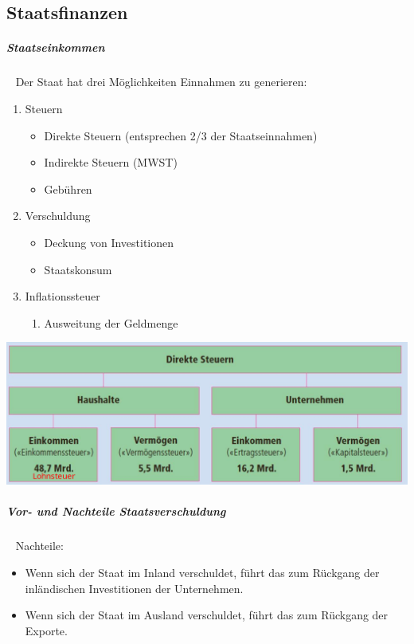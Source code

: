 \documentclass[11pt,twoside,landscape]{article}
\begin{document}
\begin{multicols}{3}
\section{Staatsfinanzen}
\label{sec:orgd2ae535}
\subparagraph{Staatseinkommen} \
\label{sec:org0307bdc}
Der Staat hat drei Möglichkeiten Einnahmen zu generieren:
\begin{enumerate}
\item Steuern
\begin{itemize}
\item Direkte Steuern (entsprechen 2/3 der Staatseinnahmen)
\item Indirekte Steuern (MWST)
\item Gebühren
\end{itemize}
\item Verschuldung
\begin{itemize}
\item Deckung von Investitionen
\item Staatskonsum
\end{itemize}
\item Inflationssteuer
\begin{enumerate}
\item Ausweitung der Geldmenge
\end{enumerate}
\end{enumerate}


{
\begin{center}
\includegraphics[width=.9\linewidth]{img/staatseinnahmen_schweiz.png}
\end{center}
\label{fig:aufteilung-der-steuern}
}

\subparagraph{Vor- und Nachteile Staatsverschuldung} \
\label{sec:orge84f11f}
Nachteile:
\begin{itemize}
\item Wenn sich der Staat im Inland verschuldet, führt das zum Rückgang der inländischen Investitionen der Unternehmen.
\item Wenn sich der Staat im Ausland verschuldet, führt das zum Rückgang der Exporte.
\end{itemize}


\end{multicols}
\end{document}
